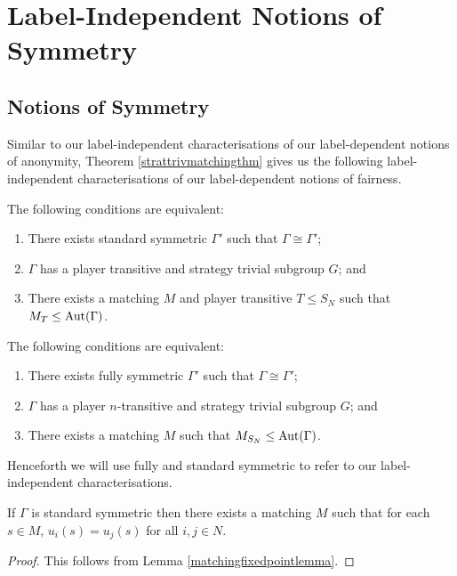 \section{Label-Independent Notions of Symmetry} \label{sec:labindnotions}
\subsection{Notions of Symmetry} \label{subsec:labelindepnotionsofsymmetry}
Similar to our label-independent characterisations of our label-dependent notions of anonymity, Theorem \ref{strattrivmatchingthm} gives us the following label-independent characterisations of our label-dependent notions of fairness.

\begin{corollary} \label{indchar1}
	The following conditions are equivalent:
	\begin{enumerate}
		\item There exists standard symmetric $\Gamma'$ such that $\Gamma \cong \Gamma'$;
		\item $\Gamma$ has a player transitive and strategy trivial subgroup $G$; and
		\item There exists a matching $M$ and player transitive $T \leq S_N$ such that $M_{T} \leq \operatorname*{Aut}(\Gamma)$.
	\end{enumerate}
\end{corollary}

\begin{corollary}  \label{indchar2}
	The following conditions are equivalent:
	\begin{enumerate}
		\item There exists fully symmetric $\Gamma'$ such that $\Gamma \cong \Gamma'$;
		\item $\Gamma$ has a player $n$-transitive and strategy trivial subgroup $G$; and
		\item There exists a matching $M$ such that $M_{S_N} \leq \operatorname*{Aut}(\Gamma)$.
	\end{enumerate}
\end{corollary}

Henceforth we will use fully and standard symmetric to refer to our label-independent characterisations. 

\begin{corollary}
	If $\Gamma$ is standard symmetric then there exists a matching $M$ such that for each $s \in M$, $u_i(s) = u_j(s)$ for all $i, j \in N$.
	\begin{proof}
		This follows from Lemma \ref{matchingfixedpointlemma}.
	\end{proof}
\end{corollary}

